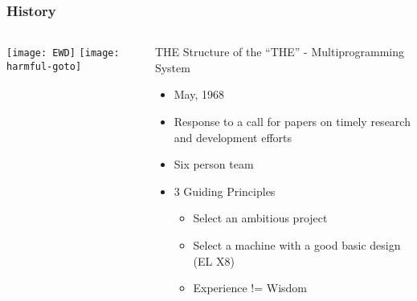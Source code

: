\begin{frame}[plain]
	\frametitle{History}
	
	
	
	\begin{columns}

		\begin{column}{.4\textwidth}
			\centering
			\texttt{[image: EWD]}
			\texttt{[image: harmful-goto]}
			
			
			
		\end{column}
		
		\begin{column}{.6\textwidth}
			
			THE Structure of the “THE” - Multiprogramming System
			\begin{itemize}
				\item May, 1968
				
				\item  Response to a call for papers on timely research and development efforts
				
				\item  Six person team

				\item  3 Guiding Principles
					\begin{itemize}
					\item Select an ambitious project
					\item Select a machine with a good basic design (EL X8)
					\item Experience != Wisdom
					\end{itemize}
					
				\end{itemize}	
					
			\end{column}

	\end{columns}


\end{frame}


